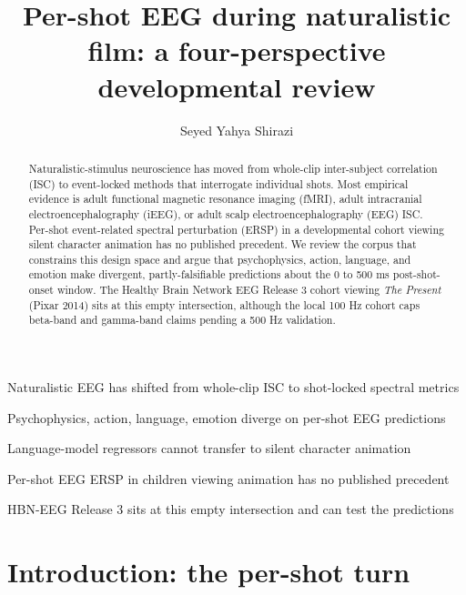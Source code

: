 \documentclass[preprint,12pt]{elsarticle}
\title{Per-shot EEG during naturalistic film: a four-perspective developmental review}
\author[1]{Seyed Yahya Shirazi\corref{cor1}}
\affiliation[1]{organization={Open Science Collective},country={USA}}
\begin{document}
\begin{frontmatter}

\begin{highlights}
  \item Naturalistic EEG has shifted from whole-clip ISC to shot-locked spectral metrics
  \item Psychophysics, action, language, emotion diverge on per-shot EEG predictions
  \item Language-model regressors cannot transfer to silent character animation
  \item Per-shot EEG ERSP in children viewing animation has no published precedent
  \item HBN-EEG Release 3 sits at this empty intersection and can test the predictions
\end{highlights}

\begin{abstract}
Naturalistic-stimulus neuroscience has moved from whole-clip inter-subject correlation (ISC) to event-locked methods that interrogate individual shots. Most empirical evidence is adult functional magnetic resonance imaging (fMRI), adult intracranial electroencephalography (iEEG), or adult scalp electroencephalography (EEG) ISC. Per-shot event-related spectral perturbation (ERSP) in a developmental cohort viewing silent character animation has no published precedent. We review the corpus that constrains this design space and argue that psychophysics, action, language, and emotion make divergent, partly-falsifiable predictions about the 0 to 500 ms post-shot-onset window. The Healthy Brain Network EEG Release 3 cohort viewing \textit{The Present} (Pixar 2014) sits at this empty intersection, although the local 100 Hz cohort caps beta-band and gamma-band claims pending a 500 Hz validation.
\end{abstract}

\end{frontmatter}

\section{Introduction: the per-shot turn}
\end{document}
